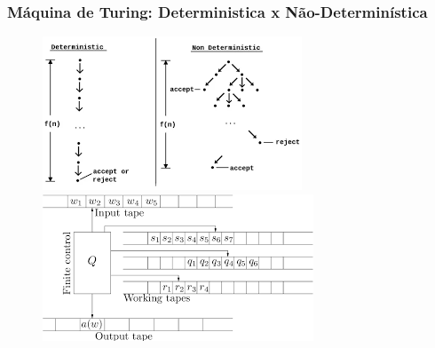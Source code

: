 \documentclass[10pt]{beamer}
\begin{document}


\begin{frame}[fragile]

\frametitle{Máquina de Turing: Deterministica  x  Não-Determinística}
\begin{figure}[!ht]
	
	\begin{minipage}[b]{0.475\linewidth}
		\centering
			\includegraphics[width=\textwidth, height =.4\textheight]
		{figuras/determ_non_determ.png}
	\end{minipage}
	\hspace{0.2cm}
	\begin{minipage}[b]{0.475\linewidth}
		\centering
		\includegraphics[width=\textwidth, height =.4\textheight]{calculo_ND_MT.png}
	\end{minipage}

\end{figure}

\end{frame}
\end{document}
